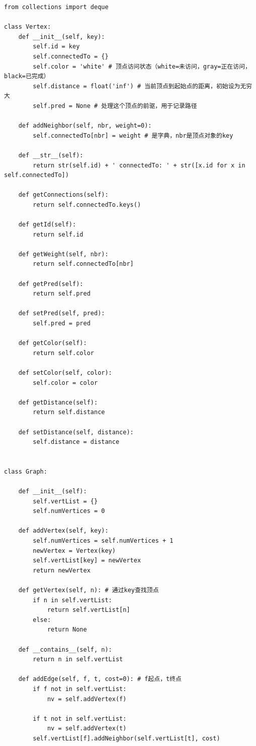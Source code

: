 \documentclass[10pt,a4paper,fontset=none]{ctexart}
\begin{document}
\begin{lstlisting}[style=py,caption={最终可用代码（对话来源）}]
from collections import deque

class Vertex:
    def __init__(self, key):
        self.id = key
        self.connectedTo = {}
        self.color = 'white' # 顶点访问状态（white=未访问，gray=正在访问，black=已完成）
        self.distance = float('inf') # 当前顶点到起始点的距离，初始设为无穷大
        self.pred = None # 处理这个顶点的前驱，用于记录路径
 
    def addNeighbor(self, nbr, weight=0):
        self.connectedTo[nbr] = weight # 是字典，nbr是顶点对象的key

    def __str__(self):
        return str(self.id) + ' connectedTo: ' + str([x.id for x in self.connectedTo])

    def getConnections(self):
        return self.connectedTo.keys()

    def getId(self):
        return self.id

    def getWeight(self, nbr):
        return self.connectedTo[nbr]

    def getPred(self):
        return self.pred

    def setPred(self, pred):
        self.pred = pred

    def getColor(self):
        return self.color

    def setColor(self, color):
        self.color = color

    def getDistance(self):
        return self.distance

    def setDistance(self, distance):
        self.distance = distance


class Graph:

    def __init__(self):
        self.vertList = {}
        self.numVertices = 0

    def addVertex(self, key):
        self.numVertices = self.numVertices + 1
        newVertex = Vertex(key)
        self.vertList[key] = newVertex
        return newVertex

    def getVertex(self, n): # 通过key查找顶点
        if n in self.vertList:
            return self.vertList[n]
        else:
            return None

    def __contains__(self, n):
        return n in self.vertList
    
    def addEdge(self, f, t, cost=0): # f起点，t终点
        if f not in self.vertList:
            nv = self.addVertex(f)

        if t not in self.vertList:
            nv = self.addVertex(t)
        self.vertList[f].addNeighbor(self.vertList[t], cost)


\end{lstlisting}
\end{document}
